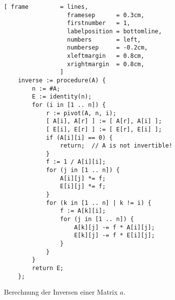 \begin{figure}[!ht]
\centering
\begin{Verbatim}[ frame         = lines, 
                  framesep      = 0.3cm, 
                  firstnumber   = 1,
                  labelposition = bottomline,
                  numbers       = left,
                  numbersep     = -0.2cm,
                  xleftmargin   = 0.8cm,
                  xrightmargin  = 0.8cm,
                ]
    inverse := procedure(A) {
        n := #A;              
        E := identity(n);
        for (i in [1 .. n]) {
            r := pivot(A, n, i);
            [ A[i], A[r] ] := [ A[r], A[i] ];   
            [ E[i], E[r] ] := [ E[r], E[i] ];
            if (A[i][i] == 0) {
                return;  // A is not invertible!
            }
            f := 1 / A[i][i]; 
            for (j in [1 .. n]) {
                A[i][j] *= f;
                E[i][j] *= f;
            }
            for (k in [1 .. n] | k != i) {
                f := A[k][i];
                for (j in [1 .. n]) {
                    A[k][j] -= f * A[i][j];
                    E[k][j] -= f * E[i][j];
                }
            }    
        }
        return E;
    };
\end{Verbatim} 
\vspace*{-0.3cm}
\caption{Berechnung der Inversen einer Matrix $a$.}
\label{fig:inverse.stlx}
\end{figure} 

